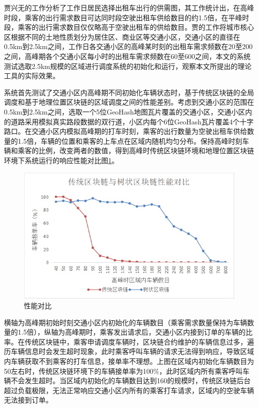 贾兴无的工作分析了工作日居民选择出租车出行的供需图，其工作统计出，在高峰时段，乘客的出行需求数目可达同时段空驶出租车供给数目的约1.5倍，在平峰时段，乘客的出行需求数目仅仅略高于空驶出租车的供给数目。贾的工作将城市核心区根据不同的土地性质划分为居住区、商业区等交通小区，交通小区的直径在0.5km到2.5km之间，工作日各交通小区的高峰某时刻的出租车需求频数在20至200之间，高峰期各个交通小区每小时的出租车需求频数在60至600之间，本文的系统测试选取2.5km规模的区域进行调度系统的初始化和运行，观察本文所提出的理论工具的实际效果。

系统首先测试了交通小区内高峰期不同初始化车辆状态时，基于传统区块链的全局调度和基于地理位置区块链的区域调度之间的性能差别。考虑到交通小区的范围在0.5km到2.5km之间，选取一个5位GeoHash地图瓦片覆盖的交通小区，交通小区内的道路采用模拟真实路段数据的双行道，小区内每个6位GeoHash瓦片覆盖4个十字路口。在交通小区内模拟高峰期的打车时刻，乘客的出行数量为空驶出租车供给数量的1.5倍，车辆的位置和乘客的上车点在区域内随机均匀分布。保持高峰时刻车辆和乘客的比例，改变两者的数值，得到高峰时传统区块链环境和地理位置区块链环境下系统运行的响应性能对比图\ref{fig:compare}。

\begin{figure}[h]
  \centering
  \includegraphics[width=1.0\textwidth]{figures/性能对比}
  \caption{性能对比}\label{fig:compare}
\end{figure}

横轴为高峰期初始时刻交通小区内初始化的车辆数目（乘客需求数量保持为车辆数量的1.5倍），纵轴为高峰期时，乘客发出请求后，交通小区内接到订单的车辆的比率。在传统区块链中，乘客申请调度车辆时，区块链合约维护的车辆信息过多，遍历车辆信息时会发生超时现象，此时乘客呼叫车辆的请求无法得到响应，导致区域内车辆获取不到乘客的打车信息，接单率不理想。上图在区域内初始化车辆数目为50左右时，传统区块链环境下的车辆接单率为100$\%$，此时区域内所有乘客呼叫车辆不会发生超时。当区域内初始化的车辆数目达到160的规模时，传统区块链后台超过负载极限，无法正常响应交通小区内所有的乘客打车请求，区域内的空驶车辆无法接到订单。

